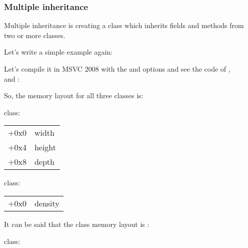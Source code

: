 \subsubsection{Multiple inheritance}


Multiple inheritance is creating a class which inherits fields and methods from two or more classes.

Let's write a simple example again:




Let's compile it in MSVC 2008 with the \Ox and \Obzero options and see the code of ,\\
 and :








So, the memory layout for all three classes is:

 class:

\begin{center}
\begin{tabular}{ | l | l | }
\hline
  \tableheader{} \\
\hline
  +0x0 & width \\
\hline
  +0x4 & height \\
\hline
  +0x8 & depth \\
\hline
\end{tabular}
\end{center}

 class:

\begin{center}
\begin{tabular}{ | l | l | }
\hline
  \tableheader{} \\
\hline
  +0x0 & density \\
\hline
\end{tabular}
\end{center}


It can be said that the  class memory layout is :

 class:

